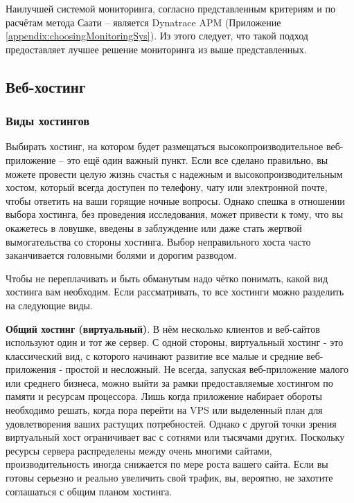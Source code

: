 \newpage

%
%
Наилучшей системой мониторинга, согласно представленным критериям и по расчётам  метода Саати – является Dynatrace APM (Приложение \ref{appendix:choosingMonitoringSys}). Из этого следует, что такой подход предоставляет лучшее решение мониторинга из выше представленных.


\subsection{Веб-хостинг}
\label{web_hosts}

\subsubsection{Виды хостингов}
\label{typeOfHosts}

Выбирать хостинг, на котором будет размещаться высокопроизводительное веб-приложение – это ещё один важный пункт. Если все сделано правильно, вы можете провести целую жизнь счастья с надежным и высокопроизводительным хостом, который всегда доступен по телефону, чату или электронной почте, чтобы ответить на ваши горящие ночные вопросы. Однако спешка в отношении выбора хостинга, без проведения исследования, может привести к тому, что вы окажетесь в ловушке, введены в заблуждение или даже стать жертвой вымогательства со стороны хостинга. Выбор неправильного хоста часто заканчивается головными болями и дорогим разводом.

Чтобы не переплачивать и быть обманутым надо чётко понимать, какой вид хостинга вам необходим. Если рассматривать, то все хостинги можно разделить на следующие виды.

\textbf{Общий хостинг (виртуальный)}. В нём несколько клиентов и веб-сайтов используют один и тот же сервер. С одной стороны, виртуальный хостинг - это классический вид, с которого начинают развитие все малые и средние веб-приложения - простой и несложный. Не всегда, запуская веб-приложение малого или среднего бизнеса, можно выйти за рамки предоставляемые хостингом по памяти и ресурсам процессора. Лишь когда приложение набирает обороты необходимо решать, когда пора перейти на VPS или выделенный план для удовлетворения ваших растущих потребностей. Однако с другой точки зрения виртуальный хост ограничивает вас с сотнями или тысячами других. Поскольку ресурсы сервера распределены между очень многими сайтами, производительность иногда снижается по мере роста вашего сайта. Если вы готовы серьезно и реально увеличить свой трафик, вы, вероятно, не захотите соглашаться с общим планом хостинга. 


